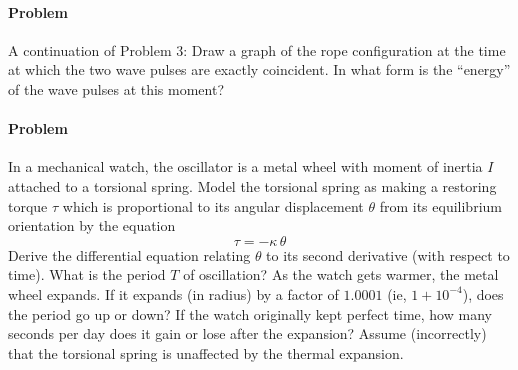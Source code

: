 \documentclass[12pt]{article}
\begin{document}
\paragraph{Problem~\theproblem}%
A continuation of Problem 3: Draw a graph of the rope configuration
at the time at which the two wave pulses are exactly coincident.  In
what form is the ``energy'' of the wave pulses at this moment?

\paragraph{Problem~\theproblem}%
In a mechanical watch, the oscillator is a metal wheel with moment of
inertia $I$ attached to a torsional spring.  Model the torsional
spring as making a restoring torque $\tau$ which is proportional to
its angular displacement $\theta$ from its equilibrium orientation by
the equation
\begin{equation}
\tau = -\kappa\,\theta \nonumber
\end{equation}
Derive the differential equation relating $\theta$ to its second
derivative (with respect to time).  What is the period $T$ of
oscillation?  As the watch gets warmer, the metal wheel expands.  If
it expands (in radius) by a factor of $1.0001$ (ie, $1+10^{-4}$), does
the period go up or down?  If the watch originally kept perfect time,
how many seconds per day does it gain or lose after the expansion?
Assume (incorrectly) that the torsional spring is unaffected by the
thermal expansion.
\end{document}
